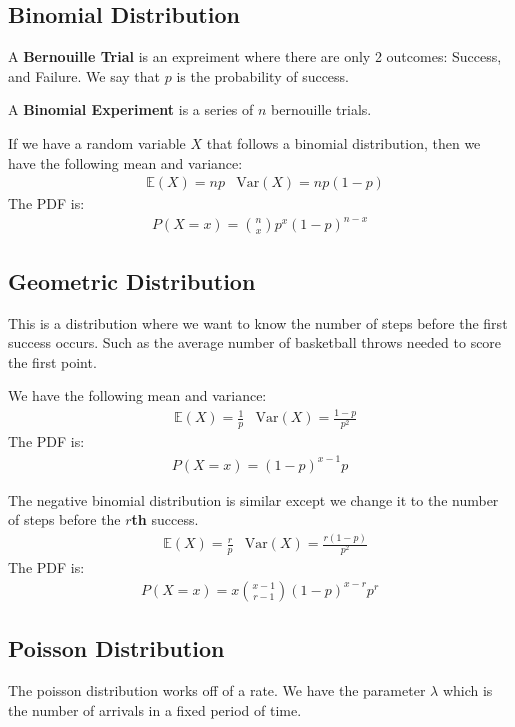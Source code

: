 \documentclass[12pt,letterpaper]{article} \usepackage{amsmath} \usepackage{graphicx} \usepackage[margin=1in]{geometry} \usepackage{longtable}  \usepackage{amssymb}
\begin{document}
	\subsection{Binomial Distribution}
	A \textbf{Bernouille Trial} is an expreiment where there are only 2 outcomes: Success, and Failure. We say that $p$ is the probability of success. 
	
	A \textbf{Binomial Experiment} is a series of $n$ bernouille trials.
	
	If we have a random variable $X$ that follows a binomial distribution, then we have the following mean and variance:
	\begin{align*}
		&\mathbb E(X) = np &\text{Var}(X) = np(1-p)
	\end{align*}
	The PDF is:
	\begin{align*}
		P(X=x)= \binom{n}{x}p^x(1-p)^{n-x}
	\end{align*}
	
	\subsection{Geometric Distribution}
	This is a distribution where we want to know the number of steps before the first success occurs. Such as the average number of basketball throws needed to score the first point. 
	
	We have the following mean and variance:
	\begin{align*}
		&\mathbb E(X) = \frac{1}{p} &\text{Var}(X) = \frac{1-p}{p^2}
	\end{align*}
	The PDF is:
	\begin{align*}
		P(X=x)=(1-p)^{x-1}p
	\end{align*}

	The negative binomial distribution is similar except we change it to the number of steps before the \textbf{$r$th} success. 
	\begin{align*}
		&\mathbb E(X) = \frac{r}{p} &\text{Var}(X) = \frac{r(1-p) }{p^2}
	\end{align*}
	The PDF is:
	\begin{align*}
		P(X=x)=x \binom{x-1}{r-1} (1-p)^{x-r}p^r
	\end{align*}

	\subsection{Poisson Distribution}
	The poisson distribution works off of a rate. We have the parameter $\lambda$ which is the number of arrivals in a fixed period of time. 
	
\end{document}
